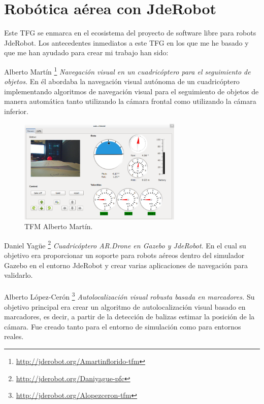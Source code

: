 \section{Robótica aérea con JdeRobot}
\hspace{1cm} Este TFG se enmarca en el ecosistema del proyecto de software libre para robots JdeRobot. Los antecedentes inmediatos a este TFG en los que me he basado y que me han ayudado para crear mi trabajo han sido:

\hspace{1cm} Alberto Martín \footnote{\url{http://jderobot.org/Amartinflorido-tfm}} \cite{AlbertoMartin} \textit{Navegación visual en un cuadricóptero para el seguimiento de objetos.} En él abordaba la navegación visual autónoma de un cuadricóptero implementando algoritmos de navegación visual para el seguimiento de objetos de manera automática tanto utilizando la cámara frontal como utilizando la cámara inferior.
\\

\begin{figure}[H]
	\begin{center}
		\includegraphics[width=0.7\textwidth]{imag/IMG8.png}
				\caption{TFM Alberto Martín.} 
	\label{fig:TFM Alberto M.}	
	\end{center}
\end{figure}

\hspace{1cm} Daniel Yagüe  \footnote{\url{http://jderobot.org/Daniyague-pfc}} \cite{DanielYague} \textit{Cuadricóptero AR.Drone en Gazebo y JdeRobot}. En el cual su objetivo era proporcionar un soporte para robots aéreos dentro del simulador Gazebo en el entorno JdeRobot y crear varias aplicaciones de navegación para validarlo.
\\
\\

\hspace{1cm} Alberto López-Cerón \footnote{\url{http://jderobot.org/Alopezceron-tfm}} \cite{AlbertoLopez} \textit{Autolocalización visual robusta basada en marcadores.} Su objetivo principal era crear un algoritmo de autolocalización visual basado en marcadores, es decir, a partir de la detección de balizas estimar la posición de la cámara. Fue creado tanto para el entorno de simulación como para entornos reales.
\\

